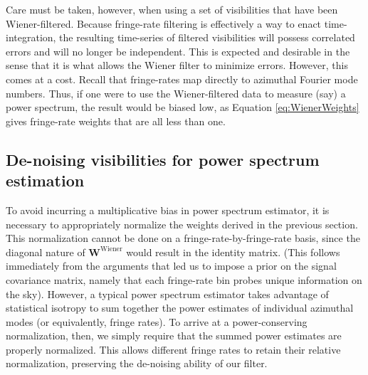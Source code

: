 \documentclass[twocolumn,apj,numberedappendix]{emulateapj}
\begin{document}
Care must be taken, however, when using a set of visibilities that have been Wiener-filtered.  Because fringe-rate filtering is effectively a way to enact time-integration, the resulting time-series of filtered visibilities will possess correlated errors and will no longer be independent.  This is expected and desirable in the sense that it is what allows the Wiener filter to minimize errors.  However, this comes at a cost.  Recall that fringe-rates map directly to azimuthal Fourier mode numbers.  Thus, if one were to use the Wiener-filtered data to measure (say) a power spectrum, the result would be biased low, as Equation \eqref{eq:WienerWeights} gives fringe-rate weights that are all less than one.

\subsection{De-noising visibilities for power spectrum estimation}

To avoid incurring a multiplicative bias in power spectrum estimator, it is necessary to appropriately normalize the weights derived in the previous section.  This normalization cannot be done on a fringe-rate-by-fringe-rate basis, since the diagonal nature of $\mathbf{W}^\textrm{Wiener}$ would result in the identity matrix.  (This follows immediately from the arguments that led us to impose a prior on the signal covariance matrix, namely that each fringe-rate bin probes unique information on the sky).  However, a typical power spectrum estimator takes advantage of statistical isotropy to sum together the power estimates of individual azimuthal modes (or equivalently, fringe rates).  To arrive at a power-conserving normalization, then, we simply require that the summed power estimates are properly normalized.  This allows different fringe rates to retain their relative normalization, preserving the de-noising ability of our filter.
\end{document}
